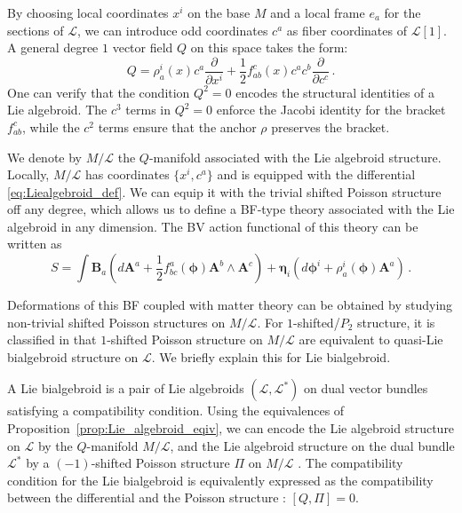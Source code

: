 \documentclass[11pt]{article}
\numberwithin{equation}{section}
\begin{document}
By choosing local coordinates $x^i$ on the base $M$ and a local frame $e_a$ for the sections of $\mathcal{L}$, we can introduce odd coordinates $c^a$ as fiber coordinates of $\mathcal{L}[1]$. A general degree $1$ vector field $Q$ on this space takes the form:
\begin{equation}\label{eq:Liealgebroid_def}
	Q = \rho^i_a(x) c^a \frac{\partial}{\partial x^i} + \frac{1}{2} f^c_{ab}(x) c^a c^b \frac{\partial}{\partial c^c}\,.
\end{equation}
One can verify that the condition $Q^2 = 0$ encodes the structural identities of a Lie algebroid. The $c^3$ terms in $Q^2=0$ enforce the Jacobi identity for the bracket $f^c_{ab}$, while the $c^2$ terms ensure that the anchor $\rho$ preserves the bracket.

We denote by $M/\mathcal{L}$ the $Q$-manifold associated with the Lie algebroid structure. Locally, $M/\mathcal{L}$ has coordinates $\{x^i,c^a\}$ and is equipped with the differential \eqref{eq:Liealgebroid_def}. We can equip it with the trivial shifted Poisson structure off any degree, which allows us to define a BF-type theory associated with the Lie algebroid in any dimension. The BV action functional of this theory can be written as
\begin{equation}\label{eq:act_algebroidBF}
	S = \int \boldsymbol{B}_a (d\boldsymbol{A}^a + \frac{1}{2} f^a_{bc}(\boldsymbol{\phi})\boldsymbol{A}^b \wedge \boldsymbol{A}^c) + \boldsymbol{\eta}_i ( d\boldsymbol{\phi}^i + \rho^i_a(\boldsymbol{\phi})\boldsymbol{A}^a )\,.
\end{equation}


Deformations of this BF coupled with matter theory can be obtained by studying non-trivial shifted Poisson structures on $M/\mathcal{L}$. For $1$-shifted/$P_2$ structure, it is classified in \cite{safronov2023shifted} that $1$-shifted Poisson structure on $M/\mathcal{L}$ are equivalent to quasi-Lie bialgebroid structure on $\mathcal{L}$. We briefly explain this for Lie bialgebroid. 

A Lie bialgebroid is a pair of Lie algebroids $(\mathcal{L}, \mathcal{L}^*)$ on dual vector bundles satisfying a compatibility condition. Using the equivalences of Proposition~\ref{prop:Lie_algebroid_eqiv}, we can encode the Lie algebroid structure on $\mathcal{L}$ by the $Q$-manifold $M/\mathcal{L}$, and the Lie algebroid structure on the dual bundle $\mathcal{L}^*$ by a $(-1)$-shifted Poisson structure $\Pi$ on $M/\mathcal{L}$ \cite{roytenberg2002structure}. The compatibility condition for the Lie bialgebroid is equivalently expressed as the compatibility between the differential and the Poisson structure : $[Q,\Pi] = 0$. 
\end{document}
